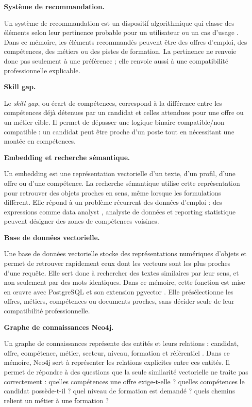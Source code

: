 \medskip
\noindent\textbf{Système de recommandation.}

Un système de recommandation est un dispositif algorithmique qui classe des éléments selon leur pertinence probable pour un utilisateur ou un cas d'usage \cite{ricci2011recommender}. Dans ce mémoire, les éléments recommandés peuvent être des offres d'emploi, des compétences, des métiers ou des pistes de formation. La pertinence ne renvoie donc pas seulement à une préférence ; elle renvoie aussi à une compatibilité professionnelle explicable.

\medskip
\noindent\textbf{Skill gap.}

Le \emph{skill gap}, ou écart de compétences, correspond à la différence entre les compétences déjà détenues par un candidat et celles attendues pour une offre ou un métier cible. Il permet de dépasser une logique binaire compatible/non compatible : un candidat peut être proche d'un poste tout en nécessitant une montée en compétences.

\medskip
\noindent\textbf{Embedding et recherche sémantique.}

Un embedding est une représentation vectorielle d'un texte, d'un profil, d'une offre ou d'une compétence. La recherche sémantique utilise cette représentation pour retrouver des objets proches en sens, même lorsque les formulations diffèrent. Elle répond à un problème récurrent des données d'emploi : des expressions comme \og data analyst \fg{}, \og analyste de données \fg{} et \og reporting statistique \fg{} peuvent désigner des zones de compétences voisines.

\medskip
\noindent\textbf{Base de données vectorielle.}

Une base de données vectorielle stocke des représentations numériques d'objets et permet de retrouver rapidement ceux dont les vecteurs sont les plus proches d'une requête. Elle sert donc à rechercher des textes similaires par leur sens, et non seulement par des mots identiques. Dans ce mémoire, cette fonction est mise en œuvre avec PostgreSQL et son extension pgvector \cite{pgvector2024}. Elle présélectionne les offres, métiers, compétences ou documents proches, sans décider seule de leur compatibilité professionnelle.

\medskip
\noindent\textbf{Graphe de connaissances Neo4j.}

Un graphe de connaissances représente des entités et leurs relations : candidat, offre, compétence, métier, secteur, niveau, formation et référentiel \cite{hogan2021knowledge}. Dans ce mémoire, Neo4j sert à représenter les relations explicites entre ces entités. Il permet de répondre à des questions que la seule similarité vectorielle ne traite pas correctement : quelles compétences une offre exige-t-elle ? quelles compétences le candidat possède-t-il ? quel niveau de formation est demandé ? quels chemins relient un métier à une formation ?


